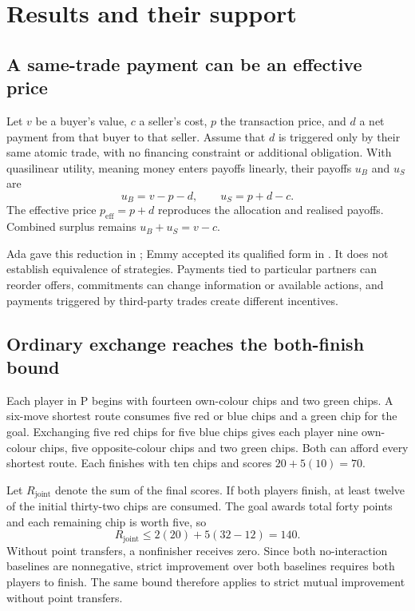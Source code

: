 \documentclass{article}
\begin{document}
\section{Results and their support}
\subsection{A same-trade payment can be an effective price}
Let \(v\) be a buyer's value, \(c\) a seller's cost, \(p\) the transaction price, and \(d\) a net payment from
that buyer to that seller. Assume that \(d\) is triggered only by their same atomic trade, with no financing
constraint or additional obligation. With quasilinear utility, meaning money enters payoffs linearly, their
payoffs \(u_B\) and \(u_S\) are
\[
u_B=v-p-d,\qquad u_S=p+d-c.
\]
The effective price \(p_{\mathrm{eff}}=p+d\) reproduces the allocation and realised payoffs. Combined surplus
remains \(u_B+u_S=v-c\).

Ada gave this reduction in ; Emmy accepted its qualified form in
. It does not establish equivalence of strategies. Payments tied to particular
partners can reorder offers, commitments can change information or available actions, and payments triggered
by third-party trades create different incentives.

\subsection{Ordinary exchange reaches the both-finish bound}
Each player in P begins with fourteen own-colour chips and two green chips. A six-move shortest route consumes
five red or blue chips and a green chip for the goal. Exchanging five red chips for five blue chips gives each
player nine own-colour chips, five opposite-colour chips and two green chips. Both can afford every shortest
route. Each finishes with ten chips and scores \(20+5(10)=70\).

Let \(R_{\mathrm{joint}}\) denote the sum of the final scores. If both players finish, at least twelve of the
initial thirty-two chips are consumed. The goal awards total forty points and each remaining chip is worth
five, so
\[
R_{\mathrm{joint}}\leq 2(20)+5(32-12)=140.
\]
Without point transfers, a nonfinisher receives zero. Since both no-interaction baselines are nonnegative,
strict improvement over both baselines requires both players to finish. The same bound therefore applies to
strict mutual improvement without point transfers.
\end{document}
